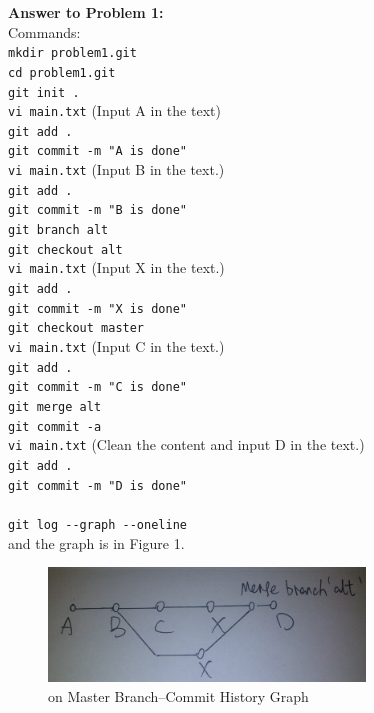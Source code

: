 \documentclass[12pt]{article}
\begin{document}
\bigskip
\noindent\textbf{Answer to Problem 1:}\\
Commands:\\
\verb+mkdir problem1.git+\\
\verb+cd problem1.git+\\
\verb+git init .+\\
\verb+vi main.txt+ (Input A in the text)\\
\verb+git add .+\\
\verb+git commit -m "A is done"+\\
\verb+vi main.txt+ (Input B in the text.)\\
\verb+git add .+\\
\verb+git commit -m "B is done"+\\
\verb+git branch alt+\\
\verb+git checkout alt+\\
\verb+vi main.txt+ (Input X in the text.)\\
\verb+git add .+\\
\verb+git commit -m "X is done"+\\
\verb+git checkout master+\\
\verb+vi main.txt+ (Input C in the text.)\\
\verb+git add .+\\
\verb+git commit -m "C is done"+\\
\verb+git merge alt+\\
\verb+git commit -a+\\
\verb+vi main.txt+ (Clean the content and input D in the text.)\\
\verb+git add .+\\
\verb+git commit -m "D is done"+\\


\\
\verb+git log --graph --oneline+\\
and the graph is in Figure 1.

\begin{figure}[htb]
    \begin{center}
        \includegraphics[width=0.75\textwidth]{figure1.png}
    \end{center}
    \caption{on Master Branch--Commit History Graph}
\end{figure}
\end{document}
